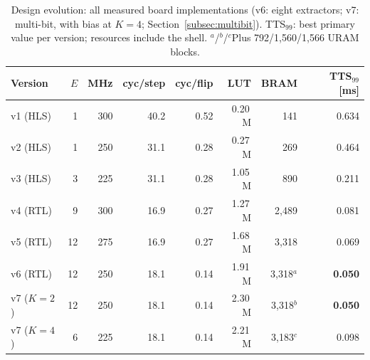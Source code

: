 \begin{table}[t]
\centering
\caption{Design evolution: all measured board implementations (v6: eight extractors; v7: multi-bit, with bias at $K{=}4$; Section~\ref{subsec:multibit}). TTS$_{99}$: best primary value per version; resources include the shell. $^{a}$/$^{b}$/$^{c}$Plus 792/1{,}560/1{,}566 URAM blocks.}
\label{tab:evo}
\setlength{\tabcolsep}{2.2pt}
\begin{tabular}{@{}lrrrrrrr@{}}
\toprule
Version & $E$ & MHz & cyc/step & cyc/flip & LUT & BRAM & TTS$_{99}$ [ms] \\
\midrule
v1 (HLS) & 1 & 300 & 40.2 & 0.52 & 0.20\,M & 141 & 0.634 \\
v2 (HLS) & 1 & 250 & 31.1 & 0.28 & 0.27\,M & 269 & 0.464 \\
v3 (HLS) & 3 & 225 & 31.1 & 0.28 & 1.05\,M & 890 & 0.211 \\
v4 (RTL) & 9 & 300 & 16.9 & 0.27 & 1.27\,M & 2{,}489 & 0.081 \\
v5 (RTL) & 12 & 275 & 16.9 & 0.27 & 1.68\,M & 3{,}318 & 0.069 \\
v6 (RTL) & 12 & 250 & 18.1 & 0.14 & 1.91\,M & 3{,}318$^{a}$ & \textbf{0.050} \\
v7 ($K{=}2$) & 12 & 250 & 18.1 & 0.14 & 2.30\,M & 3{,}318$^{b}$ & \textbf{0.050} \\
v7 ($K{=}4$) & 6 & 225 & 18.1 & 0.14 & 2.21\,M & 3{,}183$^{c}$ & 0.098 \\
\bottomrule
\end{tabular}
\vspace{-0.6em}%
\end{table}
